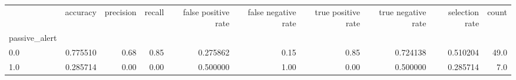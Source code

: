 \begin{tabular}{lrrrrrrrrr}
\toprule
{} &  accuracy &  precision &  recall &  false positive rate &  false negative rate &  true positive rate &  true negative rate &  selection rate &  count \\
passive\_alert &           &            &         &                      &                      &                     &                     &                 &        \\
\midrule
0.0           &  0.775510 &       0.68 &    0.85 &             0.275862 &                 0.15 &                0.85 &            0.724138 &        0.510204 &   49.0 \\
1.0           &  0.285714 &       0.00 &    0.00 &             0.500000 &                 1.00 &                0.00 &            0.500000 &        0.285714 &    7.0 \\
\bottomrule
\end{tabular}
